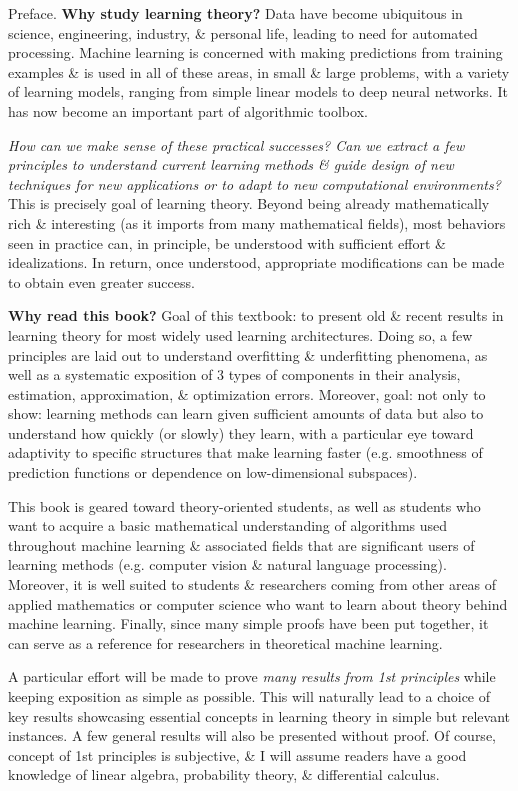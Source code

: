 \documentclass{article}
\begin{document}
\begin{enumerate}
	{\sf Preface.} {\bf Why study learning theory?} Data have become ubiquitous in science, engineering, industry, \& personal life, leading to need for automated processing. Machine learning is concerned with making predictions from training examples \& is used in all of these areas, in small \& large problems, with a variety of learning models, ranging from simple linear models to deep neural networks. It has now become an important part of algorithmic toolbox.
	
	{\it How can we make sense of these practical successes? Can we extract a few principles to understand current learning methods \& guide design of new techniques for new applications or to adapt to new computational environments?} This is precisely goal of learning theory. Beyond being already mathematically rich \& interesting (as it imports from many mathematical fields), most behaviors seen in practice can, in principle, be understood with sufficient effort \& idealizations. In return, once understood, appropriate modifications can be made to obtain even greater success.
	
	{\bf Why read this book?} Goal of this textbook: to present old \& recent results in learning theory for most widely used learning architectures. Doing so, a few principles are laid out to understand overfitting \& underfitting phenomena, as well as a systematic exposition of 3 types of components in their analysis, estimation, approximation, \& optimization errors. Moreover, goal: not only to show: learning methods can learn given sufficient amounts of data but also to understand how quickly (or slowly) they learn, with a particular eye toward adaptivity to specific structures that make learning faster (e.g. smoothness of prediction functions or dependence on low-dimensional subspaces).
	
	This book is geared toward theory-oriented students, as well as students who want to acquire a basic mathematical understanding of algorithms used throughout machine learning \& associated fields that are significant users of learning methods (e.g. computer vision \& natural language processing). Moreover, it is well suited to students \& researchers coming from other areas of applied mathematics or computer science who want to learn about theory behind machine learning. Finally, since many simple proofs have been put together, it can serve as a reference for researchers in theoretical machine learning.
	
	A particular effort will be made to prove {\it many results from 1st principles} while keeping exposition as simple as possible. This will naturally lead to a choice of key results showcasing essential concepts in learning theory in simple but relevant instances. A few general results will also be presented without proof. Of course, concept of 1st principles is subjective, \& I will assume readers have a good knowledge of linear algebra, probability theory, \& differential calculus.
	

\end{enumerate}
\end{document}
